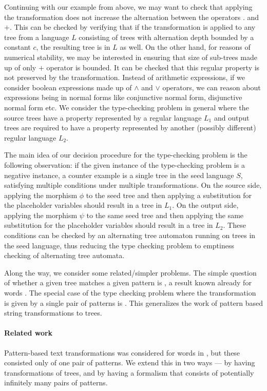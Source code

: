 Continuing with
our example from above, we may want to check that applying the
transformation does not increase the alternation between the operators
$.$ and $+$. This can be checked by verifying that if the
transformation is applied to any tree from a language $L$ consisting
of trees with alternation depth bounded by a constant $c$, the
resulting tree is in $L$ as well. On the other hand, for reasons of
numerical stability, we may be interested in ensuring that size of
sub-trees made up of only $+$ operator is bounded. It can be checked
that this regular property is not preserved by the transformation.
Instead of arithmetic expressions, if we consider boolean expressions
made up of $\land$ and $\lor$ operators, we can reason about
expressions being in normal forms like conjunctive normal form,
disjunctive normal form etc. We consider the type-checking problem in
general where the source trees have a property represented by a
regular language $L_{1}$ and output trees are required to have a
property represented by another (possibly different) regular language
$L_{2}$.

The main idea of our decision procedure for the type-checking problem
is the following observation: if the given instance of the
type-checking problem is a negative instance, a counter example is a
single tree in the seed language $S$, satisfying multiple conditions
under multiple transformations. On the source side, applying the
morphism $\phi$ to the seed tree and then applying a substitution for
the placeholder variables should result in a tree in $L_{1}$. On the
output side, applying the morphism $\psi$ to the same seed tree and
then applying the same substitution for the placeholder variables
should result in a tree in $L_{2}$. These conditions can be
checked by an alternating tree automaton running on trees in the seed
language, thus reducing the type checking problem to emptiness
checking of alternating tree automata.

Along the way, we consider some related/simpler problems. The simple question of whether a given tree matches a given pattern is \nptc, a result known already for words \cite{tata}. The special case of the type checking problem where the transformation is given by a single pair of patterns is \exptc. This generalizes the work of pattern based string transformations \cite{AMP2022} to trees.

\paragraph*{Related work}
Pattern-based text transformations was considered for words in \cite{AMP2022}, but these consisted only of one pair of patterns. We extend this in two ways --- by having  transformations of trees, and by having a formalism that consists of potentially infinitely many  pairs of patterns. 

